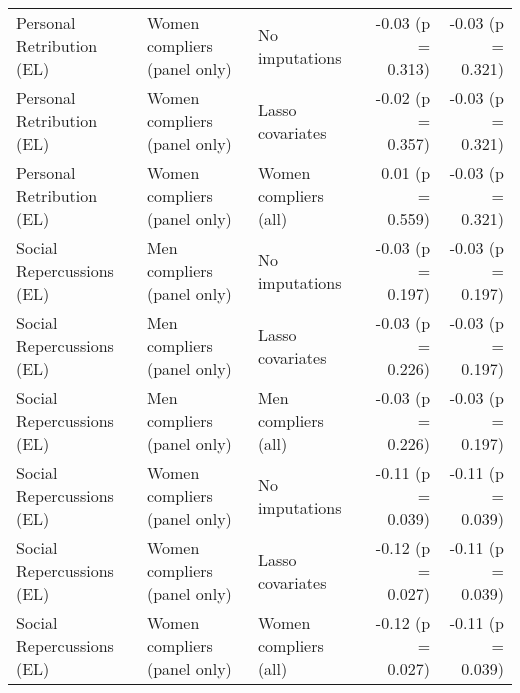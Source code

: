 \begin{tabular}{lllrr}
  Personal Retribution (EL) & Women compliers (panel only) & No imputations & -0.03 (p = 0.313) & -0.03 (p = 0.321) \\ 
  Personal Retribution (EL) & Women compliers (panel only) & Lasso covariates & -0.02 (p = 0.357) & -0.03 (p = 0.321) \\ 
  Personal Retribution (EL) & Women compliers (panel only) & Women compliers (all) & 0.01 (p = 0.559) & -0.03 (p = 0.321) \\ 
  Social Repercussions (EL) & Men compliers (panel only) & No imputations & -0.03 (p = 0.197) & -0.03 (p = 0.197) \\ 
  Social Repercussions (EL) & Men compliers (panel only) & Lasso covariates & -0.03 (p = 0.226) & -0.03 (p = 0.197) \\ 
  Social Repercussions (EL) & Men compliers (panel only) & Men compliers (all) & -0.03 (p = 0.226) & -0.03 (p = 0.197) \\ 
  Social Repercussions (EL) & Women compliers (panel only) & No imputations & -0.11 (p = 0.039) & -0.11 (p = 0.039) \\ 
  Social Repercussions (EL) & Women compliers (panel only) & Lasso covariates & -0.12 (p = 0.027) & -0.11 (p = 0.039) \\ 
  Social Repercussions (EL) & Women compliers (panel only) & Women compliers (all) & -0.12 (p = 0.027) & -0.11 (p = 0.039) \\ 
   \hline
\end{tabular}
